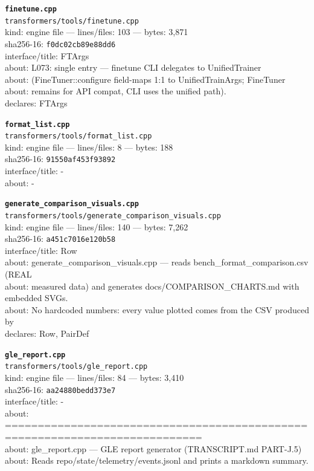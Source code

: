 \noindent\textbf{\texttt{finetune.cpp}}\\
\texttt{transformers/tools/finetune.cpp}\\
kind: engine file --- lines/files: 103 --- bytes: 3,871\\
sha256-16: \texttt{f0dc02cb89e88dd6}\\
interface/title: FTArgs\\
about: L073: single entry — finetune CLI delegates to UnifiedTrainer\\
about: (FineTuner::configure field-maps 1:1 to UnifiedTrainArgs; FineTuner\\
about: remains for API compat, CLI uses the unified path).\\
declares: FTArgs\\
\vspace*{6.0pt}
\newpage

\noindent\textbf{\texttt{format\_list.cpp}}\\
\texttt{transformers/tools/format\_list.cpp}\\
kind: engine file --- lines/files: 8 --- bytes: 188\\
sha256-16: \texttt{91550af453f93892}\\
interface/title: -\\
about: -\\
\vspace*{6.0pt}

\noindent\textbf{\texttt{generate\_comparison\_visuals.cpp}}\\
\texttt{transformers/tools/generate\_comparison\_visuals.cpp}\\
kind: engine file --- lines/files: 140 --- bytes: 7,262\\
sha256-16: \texttt{a451c7016e120b58}\\
interface/title: Row\\
about: generate\_comparison\_visuals.cpp — reads bench\_format\_comparison.csv (REAL\\
about: measured data) and generates docs/COMPARISON\_CHARTS.md with embedded SVGs.\\
about: No hardcoded numbers: every value plotted comes from the CSV produced by\\
declares: Row, PairDef\\
\vspace*{6.0pt}

\noindent\textbf{\texttt{gle\_report.cpp}}\\
\texttt{transformers/tools/gle\_report.cpp}\\
kind: engine file --- lines/files: 84 --- bytes: 3,410\\
sha256-16: \texttt{aa24880bedd373e7}\\
interface/title: -\\
about: ============================================================================\\
about: gle\_report.cpp — GLE report generator (TRANSCRIPT.md PART-J.5)\\
about: Reads repo/state/telemetry/events.jsonl and prints a markdown summary.\\
\vspace*{6.0pt}

